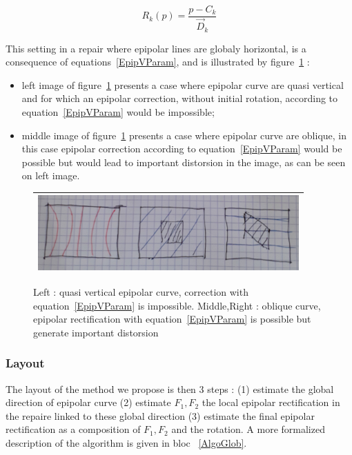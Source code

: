 \documentclass[a4paper]{article}
\begin{document}
\begin{equation}
    R_k(p) =  \frac{p-C_k}{\vec{D}_k}  \label{EqRot}
\end{equation}


This setting in a repair where epipolar lines are globaly horizontal, is
a consequence of equations~\ref{EpipVParam}, and is illustrated by figure~\ref{ReqOrient} :

\begin{itemize}
   \item left image of figure~\ref{ReqOrient} presents a case where epipolar curve are quasi vertical
         and for which an epipolar correction, without initial rotation,  
          according to equation~\ref{EpipVParam} would be impossible;
   \item middle image of figure~\ref{ReqOrient} presents a case where epipolar curve are oblique,
         in this case epipolar correction according to equation~\ref{EpipVParam} would be possible
         but would lead to important distorsion in the image, as can be seen on left image.
\end{itemize}




\begin{figure}
\centering
\begin{tabular}{||c||}
 \hline \hline
\includegraphics[width=10cm]{FIGS/EpipReqOrient.jpg}
 \\ \hline \hline
\end{tabular}
\caption{Left : quasi vertical epipolar curve, correction with equation~\ref{EpipVParam} is impossible. 
         Middle,Right  : oblique curve, epipolar rectification  with equation~\ref{EpipVParam} is possible
         but generate important distorsion}
\label{ReqOrient}
\end{figure}





\subsubsection{Layout}

The layout of the method we propose is then $3$ steps : (1) estimate the global 
direction of epipolar curve (2) estimate $F_1,F_2$ the local epipolar rectification
 in the repaire linked to these global direction (3)  estimate the final
epipolar rectification as a composition of $F_1,F_2$ and the rotation.
A more formalized description of the algorithm is given in bloc ~\ref{AlgoGlob}.
\end{document}
